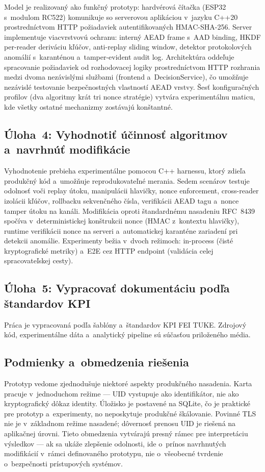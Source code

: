 Model je realizovaný ako funkčný prototyp: hardvérová čítačka (ESP32 s~modulom RC522) komunikuje so serverovou aplikáciou v~jazyku C++20 prostredníctvom HTTP požiadaviek autentifikovaných HMAC-SHA-256. Server implementuje viacvrstvovú ochranu: interný AEAD frame s~AAD binding, HKDF per-reader deriváciu kľúčov, anti-replay sliding window, detektor protokolových anomálií s~karanténou a~tamper-evident audit log. Architektúra oddeľuje spracovanie požiadaviek od rozhodovacej logiky prostredníctvom HTTP rozhrania medzi dvoma nezávislými službami (frontend a~DecisionService), čo umožňuje nezávislé testovanie bezpečnostných vlastností AEAD vrstvy. Šesť konfiguračných profilov (dva algoritmy krát tri nonce stratégie) vytvára experimentálnu maticu, kde všetky ostatné mechanizmy zostávajú konštantné.

\subsection{Úloha~4: Vyhodnotiť účinnosť algoritmov a~navrhnúť modifikácie}

Vyhodnotenie prebieha experimentálne pomocou C++ harnessu, ktorý zdieľa produkčný kód a~umožňuje reprodukovateľné merania. Sedem scenárov testuje odolnosť voči replay útoku, manipulácii hlavičky, nonce enforcement, cross-reader izolácii kľúčov, rollbacku sekvenčného čísla, verifikácii AEAD tagu a~nonce tamper útoku na kanáli. Modifikácia oproti štandardnému nasadeniu RFC~8439 spočíva v~deterministickej konštrukcii nonce (HMAC z~kontextu hlavičky), runtime verifikácii nonce na serveri a~automatickej karanténe zariadení pri detekcii anomálie. Experimenty bežia v~dvoch režimoch: in-process (čisté kryptografické metriky) a~E2E cez HTTP endpoint (validácia celej spracovateľskej cesty).

\subsection{Úloha~5: Vypracovať dokumentáciu podľa štandardov KPI}

Práca je vypracovaná podľa šablóny a~štandardov KPI FEI TUKE. Zdrojový kód, experimentálne dáta a~analytický pipeline sú súčasťou priloženého média.

\subsection{Podmienky a~obmedzenia riešenia}

Prototyp vedome zjednodušuje niektoré aspekty produkčného nasadenia. Karta pracuje v~jednoduchom režime --- UID vystupuje ako identifikátor, nie ako kryptografický dôkaz identity. Úložisko je postavené na SQLite, čo je praktické pre prototyp a~experimenty, no neposkytuje produkčné škálovanie. Povinné TLS nie je v~základnom režime nasadené; dôvernosť prenosu UID je riešená na aplikačnej úrovni. Tieto obmedzenia vytvárajú presný rámec pre interpretáciu výsledkov --- ak sa ukáže zlepšenie odolnosti, ide o~prínos navrhnutých modifikácií v~rámci definovaného prototypu, nie o~všeobecné tvrdenie o~bezpečnosti prístupových systémov.

